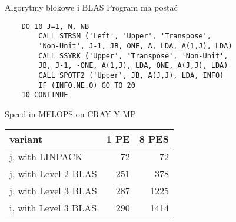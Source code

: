 \begin{frame}[fragile]{Algorytmy blokowe i BLAS}
	Program ma postać
		\begin{lstlisting}
    DO 10 J=1, N, NB
        CALL STRSM ('Left', 'Upper', 'Transpose', 
        'Non-Unit', J-1, JB, ONE, A, LDA, A(1,J), LDA)
        CALL SSYRK ('Upper', 'Transpose', 'Non-Unit', 
        JB, J-1, -ONE, A(1,J), LDA, ONE, A(J,J), LDA)
        CALL SPOTF2 ('Upper', JB, A(J,J), LDA, INFO)
        IF (INFO.NE.O) GO TO 20
    10 CONTINUE
		\end{lstlisting}
\end{frame}


	\begin{frame}{Speed in MFLOPS on CRAY Y-MP}
		\begin{center}
    			\begin{tabular}{| l | r | r |}
   				 \hline
				 variant & 1 PE & 8 PES \\
				 \hline
				 j, with LINPACK & 72 & 72 \\
				 j, with Level 2 BLAS & 251 & 378 \\
				 j, with Level 3 BLAS & 287 & 1225 \\
				 i, with Level 3 BLAS & 290 & 1414 \\
				 \hline
			\end{tabular}
		\end{center}
	\end{frame}
	

% 	